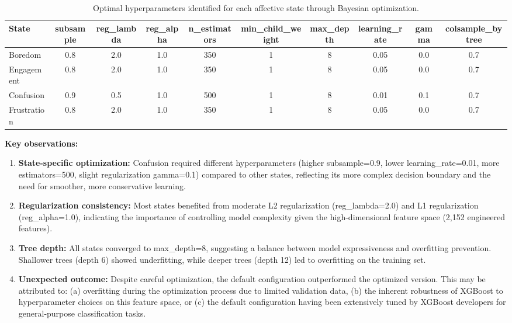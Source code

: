 \begin{table}[t]
\centering
\caption{Optimal hyperparameters identified for each affective state through Bayesian optimization.}
\label{tab:optimal-hyperparams}
\begin{tabular}{lccccccccc}
\toprule
\textbf{State} & subsample & reg\_lambda & reg\_alpha & n\_estimators & min\_child\_weight & max\_depth & learning\_rate & gamma & colsample\_bytree \\
\midrule
Boredom & 0.8 & 2.0 & 1.0 & 350 & 1 & 8 & 0.05 & 0.0 & 0.7 \\
Engagement & 0.8 & 2.0 & 1.0 & 350 & 1 & 8 & 0.05 & 0.0 & 0.7 \\
Confusion & 0.9 & 0.5 & 1.0 & 500 & 1 & 8 & 0.01 & 0.1 & 0.7 \\
Frustration & 0.8 & 2.0 & 1.0 & 350 & 1 & 8 & 0.05 & 0.0 & 0.7 \\
\bottomrule
\end{tabular}
\end{table}

\textbf{Key observations:}
\begin{enumerate}
    \item \textbf{State-specific optimization:} Confusion required different hyperparameters (higher subsample=0.9, lower learning\_rate=0.01, more estimators=500, slight regularization gamma=0.1) compared to other states, reflecting its more complex decision boundary and the need for smoother, more conservative learning.

    \item \textbf{Regularization consistency:} Most states benefited from moderate L2 regularization (reg\_lambda=2.0) and L1 regularization (reg\_alpha=1.0), indicating the importance of controlling model complexity given the high-dimensional feature space (2,152 engineered features).

    \item \textbf{Tree depth:} All states converged to max\_depth=8, suggesting a balance between model expressiveness and overfitting prevention. Shallower trees (depth 6) showed underfitting, while deeper trees (depth 12) led to overfitting on the training set.

    \item \textbf{Unexpected outcome:} Despite careful optimization, the default configuration outperformed the optimized version. This may be attributed to: (a) overfitting during the optimization process due to limited validation data, (b) the inherent robustness of XGBoost to hyperparameter choices on this feature space, or (c) the default configuration having been extensively tuned by XGBoost developers for general-purpose classification tasks.
\end{enumerate}

